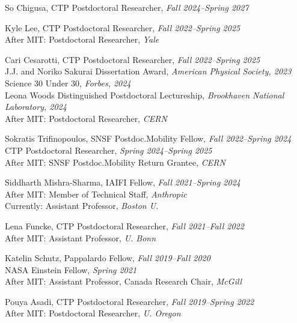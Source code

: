\bbl

\item So Chigusa, CTP Postdoctoral Researcher, \emph{Fall 2024--Spring 2027}

\item Kyle Lee, CTP Postdoctoral Researcher, \emph{Fall 2022--Spring 2025}
\\ After MIT: Postdoctoral Researcher, \emph{Yale}

\item Cari Cesarotti, CTP Postdoctoral Researcher, \emph{Fall 2022--Spring 2025}
\\ J.J. and Noriko Sakurai Dissertation Award, \emph{American Physical Society, 2023}
\\ Science 30 Under 30, \emph{Forbes, 2024}
\\ Leona Woods Distinguished Postdoctoral Lectureship, \emph{Brookhaven National Laboratory, 2024}
\\ After MIT: Postdoctoral Researcher, \emph{CERN}

\item Sokratis Trifinopoulos, SNSF Postdoc.Mobility Fellow, \emph{Fall 2022--Spring 2024}
\\ CTP Postdoctoral Researcher, \emph{Spring 2024--Spring 2025}
\\ After MIT: SNSF Postdoc.Mobility Return Grantee, \emph{CERN}

\item Siddharth Mishra-Sharma, IAIFI Fellow, \emph{Fall 2021--Spring 2024}
\\ After MIT: Member of Technical Staff, \emph{Anthropic}
\\ Currently: Assistant Professor, \emph{Boston U.}

\item Lena Funcke, CTP Postdoctoral Researcher, \emph{Fall 2021--Fall 2022}
\\ After MIT: Assistant Professor, \emph{U. Bonn}

\item Katelin Schutz, Pappalardo Fellow, \emph{Fall 2019--Fall 2020}
\\ NASA Einstein Fellow, \emph{Spring 2021}
\\ After MIT: Assistant Professor, Canada Research Chair, \emph{McGill}

\item Pouya Asadi, CTP Postdoctoral Researcher, \emph{Fall 2019--Spring 2022}
\\ After MIT: Postdoctoral Researcher, \emph{U. Oregon}

